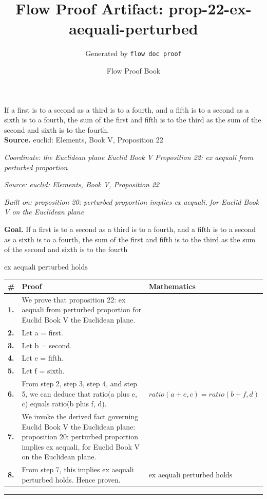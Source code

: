 \documentclass[11pt]{article}
\title{Flow Proof Artifact: prop-22-ex-aequali-perturbed}
\author{Generated by \texttt{flow doc proof}}
\date{Flow Proof Book}
\theoremstyle{definition}
\begin{document}
\maketitle
If a first is to a second as a third is to a fourth, and a fifth is to a second as a sixth is to a fourth, the sum of the first and fifth is to the third as the sum of the second and sixth is to the fourth.\\[0.5em]
\textbf{Source.} euclid: Elements, Book V, Proposition 22\\[0.5em]
\bigskip
{}\par
\smallskip\noindent\textit{Coordinate: the Euclidean plane \cdot Euclid Book V \cdot Proposition 22: ex aequali from perturbed proportion}\par
\smallskip\noindent\textit{Source: euclid: Elements, Book V, Proposition 22}\par
\smallskip\noindent\textit{Built on: proposition 20: perturbed proportion implies ex aequali, for Euclid Book V on the Euclidean plane}\par
\medskip
\noindent\textbf{Goal.} If a first is to a second as a third is to a fourth, and a fifth is to a second as a sixth is to a fourth, the sum of the first and fifth is to the third as the sum of the second and sixth is to the fourth\par
\noindent$\displaystyle \text{ex aequali perturbed holds}$\par
\medskip
\noindent
\begin{tabular}{@{} >{\raggedright\arraybackslash}p{} >{\raggedright\arraybackslash}p{} >{\raggedleft\arraybackslash}p{} @{}}
\textbf{\#} & \textbf{Proof} & \textbf{Mathematics} \\
\midrule
\textbf{1.} & We prove that proposition 22: ex aequali from perturbed proportion for Euclid Book V the Euclidean plane. & \\[0.45em]
\textbf{2.} & Let a = first. & \\[0.45em]
\textbf{3.} & Let b = second. & \\[0.45em]
\textbf{4.} & Let e = fifth. & \\[0.45em]
\textbf{5.} & Let f = sixth. & \\[0.45em]
\textbf{6.} & From step 2, step 3, step 4, and step 5, we can deduce that ratio(a plus e, c) equals ratio(b plus f, d). & $\displaystyle ratio(a + e, c) = ratio(b + f, d)$ \\[0.45em]
\textbf{7.} & We invoke the derived fact governing Euclid Book V the Euclidean plane: proposition 20: perturbed proportion implies ex aequali, for Euclid Book V on the Euclidean plane. & \\[0.45em]
\textbf{8.} & From step 7, this implies ex aequali perturbed holds. Hence proven. & $\displaystyle \text{ex aequali perturbed holds}$ \\[0.45em]
\bottomrule
\end{tabular}
\label{thm:Geometry-Euclid Book V-proposition_22_ex_aequali_from_perturbed_proportion}
\par\medskip\hrule
\end{document}
